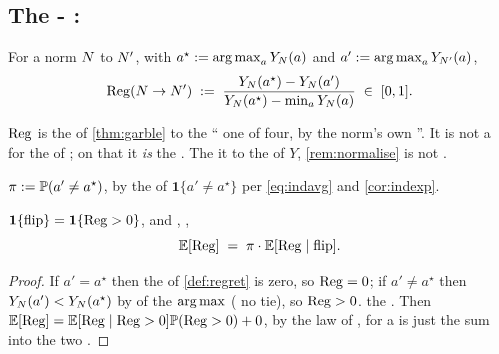 \subsection{The -  :  }

\begin{definition}
\label{def:regret}
For a   norm $N$ to $N'$, with $a^\star := \operatorname*{arg\,max}_a Y_{N}(a)$
and $a' := \operatorname*{arg\,max}_a Y_{N'}(a)$,
\[
\mathrm{Reg}(N\to N') \;:=\;
\frac{Y_{N}(a^\star) - Y_{N}(a')}{Y_{N}(a^\star) - \min_a Y_{N}(a)}
\;\in\;[0,1].
\]
\end{definition}

 $\mathrm{Reg}$ is  the 
 of \cref{thm:garble}  to the   `` one of
 four,  by the  norm's own ''. It is not a  for
the  of ; on that  it \emph{is} the . The
  it  to the   of $Y$, 
\cref{rem:normalise}  is not .

\begin{definition}
$\pi := \mathbb{P}(a' \neq a^\star)$,  by the  of
$\mathbf{1}\{a'\neq a^\star\}$ per \cref{eq:indavg} and \cref{cor:indexp}.
\end{definition}

\begin{lemma}
\label{lem:coarsen}
$\mathbf{1}\{\text{flip}\} = \mathbf{1}\{\mathrm{Reg}>0\}$, and , ,
\[
\mathbb{E}[\mathrm{Reg}] \;=\; \pi \cdot \mathbb{E}[\mathrm{Reg} \mid \text{flip}].
\]
\end{lemma}
\begin{proof}
If $a'=a^\star$ then the  of \cref{def:regret} is zero, so $\mathrm{Reg}=0$; if
$a'\neq a^\star$ then $Y_N(a')<Y_N(a^\star)$ by  of the $\operatorname*{arg\,max}$
( no  tie), so $\mathrm{Reg}>0$.  the  . Then
$\mathbb{E}[\mathrm{Reg}] = \mathbb{E}[\mathrm{Reg} \mid \mathrm{Reg}>0]\mathbb{P}(\mathrm{Reg}>0) + 0$, by the law of 
,  for a   is just  the  sum into the
two .
\end{proof}

